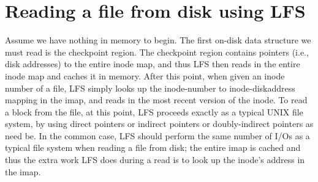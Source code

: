 \section*{Reading a file from disk using LFS}
Assume we have nothing in memory to begin. The first on-disk data structure we must read is the checkpoint region. The checkpoint region contains pointers (i.e., disk addresses) to the entire inode map, and thus LFS then reads in the entire inode map and caches it in memory. After this point, when given an inode number of a file, LFS simply looks up the inode-number to inode-diskaddress mapping in the imap, and reads in the most recent version of the inode. To read a block from the file, at this point, LFS proceeds exactly as a typical UNIX file system, by using direct pointers or indirect pointers or doubly-indirect pointers as need be. In the common case, LFS should perform the same number of I/Os as a typical file system when reading a file from disk; the entire imap is cached and thus the extra work LFS does during a read is to look up the inode’s address in the imap.

